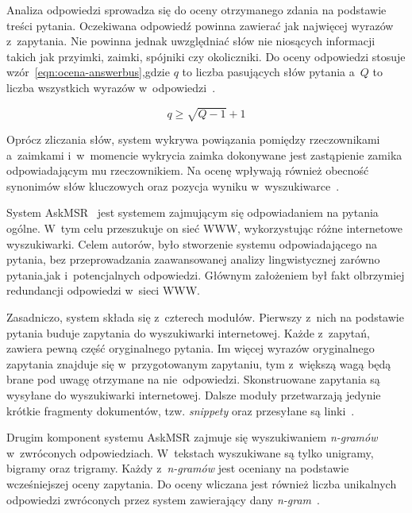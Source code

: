 Analiza odpowiedzi sprowadza się do oceny otrzymanego zdania na podstawie treści pytania. Oczekiwana odpowiedź powinna zawierać jak najwięcej wyrazów z~zapytania. Nie powinna jednak uwzględniać słów nie niosących informacji takich jak przyimki, zaimki, spójniki czy okoliczniki. Do oceny odpowiedzi stosuje wzór~\ref{eqn:ocena-answerbus},gdzie $q$ to liczba pasujących słów pytania a~$Q$ to liczba wszystkich wyrazów w~odpowiedzi~\cite{zheng2002answerbus}.

\begin{equation}
\label{eqn:ocena-answerbus}
q \geq  \sqrt{Q - 1}  + 1
\end{equation}

Oprócz zliczania słów, system wykrywa powiązania pomiędzy rzeczownikami a~zaimkami i~w~momencie wykrycia zaimka dokonywane jest zastąpienie zamika odpowiadającym mu rzeczownikiem. Na ocenę wpływają również obecność synonimów słów kluczowych oraz pozycja wyniku w~wyszukiwarce~\cite{zheng2002answerbus}.

\label{askmr}
System AskMSR~\cite{brill2002analysis} jest systemem zajmującym się odpowiadaniem na pytania ogólne. W~tym celu przeszukuje on sieć WWW, wykorzystując różne internetowe wyszukiwarki. Celem autorów, było stworzenie systemu odpowiadającego na pytania, bez przeprowadzania zaawansowanej analizy lingwistycznej zarówno pytania,jak i~potencjalnych odpowiedzi. Głównym założeniem był fakt olbrzymiej redundancji odpowiedzi w~sieci WWW.

Zasadniczo, system składa się z~czterech modułów. Pierwszy z~nich na podstawie pytania buduje zapytania do wyszukiwarki internetowej. Każde z~zapytań, zawiera pewną część oryginalnego pytania. Im więcej wyrazów oryginalnego zapytania znajduje się w~przygotowanym zapytaniu, tym z~większą wagą będą brane pod uwagę otrzymane na nie odpowiedzi. Skonstruowane zapytania są wysyłane do wyszukiwarki internetowej. Dalsze moduły przetwarzają jedynie krótkie fragmenty dokumentów, tzw. \emph{snippety} oraz przesyłane są linki~\cite{brill2002analysis}.

Drugim komponent systemu AskMSR zajmuje się wyszukiwaniem \emph{n-gramów} w~zwróconych odpowiedziach. W~tekstach wyszukiwane są tylko unigramy, bigramy oraz trigramy. Każdy z~\emph{n-gramów} jest oceniany na podstawie wcześniejszej oceny zapytania. Do oceny wliczana jest również liczba unikalnych odpowiedzi zwróconych przez system zawierający dany \emph{n-gram}~\cite{brill2002analysis}.

